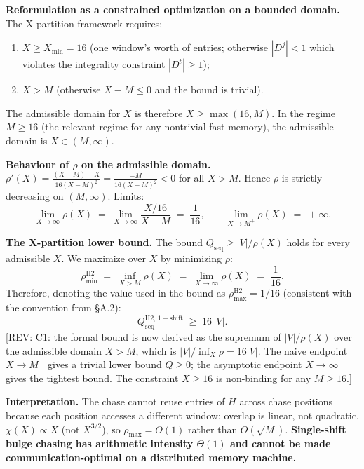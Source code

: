 \documentclass[11pt]{article}
\newcommand{\REV}[1]{\textcolor{blue!60!black}{\small\textsf{[REV: #1]}}}
\begin{document}
\textbf{Reformulation as a constrained optimization on a bounded domain.}
The X-partition framework requires:
\begin{enumerate}[leftmargin=2em]
  \item $X \ge X_{\min} = 16$ (one window's worth of entries; otherwise
    $|D^j| < 1$ which violates the integrality constraint $|D^t| \ge 1$);
  \item $X > M$ (otherwise $X - M \le 0$ and the bound is trivial).
\end{enumerate}
The admissible domain for $X$ is therefore $X \ge \max(16, M)$. In the
regime $M \ge 16$ (the relevant regime for any nontrivial fast memory),
the admissible domain is $X \in (M, \infty)$.

\textbf{Behaviour of $\rho$ on the admissible domain.}
$\rho'(X) = \frac{(X-M) - X}{16(X-M)^2} = \frac{-M}{16(X-M)^2} < 0$
for all $X > M$. Hence $\rho$ is strictly decreasing on $(M, \infty)$.
Limits:
\[
  \lim_{X \to \infty} \rho(X)
  \;=\; \lim_{X\to\infty} \frac{X/16}{X-M}
  \;=\; \frac{1}{16},
  \qquad
  \lim_{X \to M^+} \rho(X) \;=\; +\infty.
\]

\textbf{The X-partition lower bound.}
The bound $Q_{\mathrm{seq}} \ge |V|/\rho(X)$ holds for every admissible
$X$. We maximize over $X$ by minimizing $\rho$:
\[
  \rho_{\min}^{\mathrm{H2}}
  \;=\; \inf_{X > M}\rho(X)
  \;=\; \lim_{X\to\infty}\rho(X)
  \;=\; \frac{1}{16}.
\]
Therefore, denoting the value used in the bound as
$\rho_{\max}^{\mathrm{H2}} = 1/16$ (consistent with the convention from
\S A.2):
\[
  \boxed{\;
  Q_{\mathrm{seq}}^{\mathrm{H2,\,1-shift}}
  \;\ge\; 16\,|V|.
  \;}
\]
\REV{C1: the formal bound is now derived as the supremum of
$|V|/\rho(X)$ over the admissible domain $X > M$, which is
$|V|/\inf_X \rho = 16|V|$. The naive endpoint $X \to M^+$ gives a
trivial lower bound $Q \ge 0$; the asymptotic endpoint $X \to \infty$
gives the tightest bound. The constraint $X \ge 16$ is non-binding for
any $M \ge 16$.}

\textbf{Interpretation.} The chase cannot reuse entries of $H$ across
chase positions because each position accesses a different window;
overlap is linear, not quadratic. $\chi(X) \propto X$ (not $X^{3/2}$),
so $\rho_{\max} = O(1)$ rather than $O(\sqrt{M})$.
\textbf{Single-shift bulge chasing has arithmetic intensity $\Theta(1)$
and cannot be made communication-optimal on a distributed memory
machine.}
\end{document}
